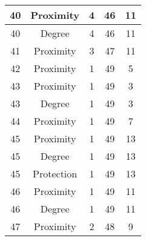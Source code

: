 \documentclass[results.tex]{subfiles}
\begin{document}
\begin{center}
\begin{tabular}{| c || c | c | c | c |}
            \hline
            40                      & Proximity                    & 4                      & 46                      & 11                   \\
            \hline
            40                      & Degree                       & 4                      & 46                      & 11                   \\
            \hline
            41                      & Proximity                    & 3                      & 47                      & 11                   \\
            \hline
            42                      & Proximity                    & 1                      & 49                      & 5                    \\
            \hline
            43                      & Proximity                    & 1                      & 49                      & 3                    \\
            \hline
            43                      & Degree                       & 1                      & 49                      & 3                    \\
            \hline
            44                      & Proximity                    & 1                      & 49                      & 7                    \\
            \hline
            45                      & Proximity                    & 1                      & 49                      & 13                   \\
            \hline
            45                      & Degree                       & 1                      & 49                      & 13                   \\
            \hline
            45                      & Protection                   & 1                      & 49                      & 13                   \\
            \hline
            46                      & Proximity                    & 1                      & 49                      & 11                   \\
            \hline
            46                      & Degree                       & 1                      & 49                      & 11                   \\
            \hline
            47                      & Proximity                    & 2                      & 48                      & 9                    \\

\end{tabular}
\end{center}
\end{document}
